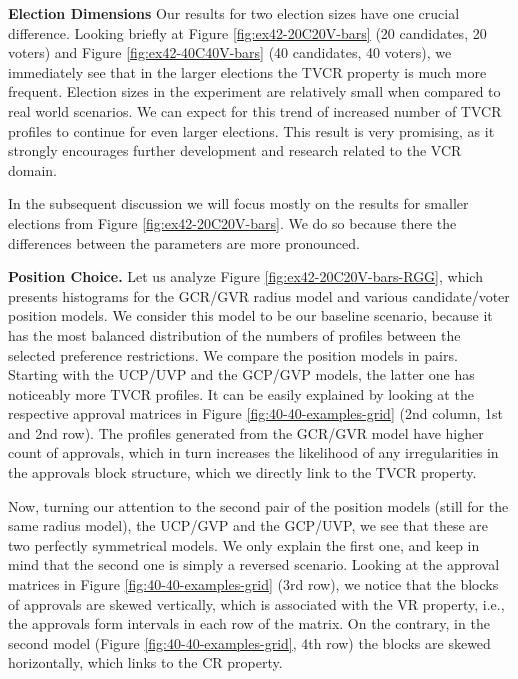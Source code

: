 \noindent \textbf{Election Dimensions} 
\indent Our results for two election sizes have one crucial difference.
Looking briefly at Figure \ref{fig:ex42-20C20V-bars} (20 candidates, 20 voters)
and Figure \ref{fig:ex42-40C40V-bars} (40 candidates, 40 voters), 
we immediately see that in the larger elections the TVCR property is much more frequent.
Election sizes in the experiment are relatively small when compared to real world scenarios.
We can expect for this trend of increased number of TVCR profiles to continue for even larger elections.
This result is very promising, as it strongly encourages further development and research related to the VCR domain.

In the subsequent discussion we will focus mostly on the results for smaller elections from
Figure \ref{fig:ex42-20C20V-bars}. We do so because there the differences between the parameters are more pronounced.
\newline

\noindent \textbf{Position Choice.} \indent Let us analyze Figure \ref{fig:ex42-20C20V-bars-RGG},
which presents histograms for the GCR/GVR radius model and various candidate/voter position models.
We consider this model to be our baseline scenario,
because it has the most balanced distribution of the numbers of profiles between the selected preference restrictions.
We compare the position models in pairs. 
Starting with the UCP/UVP and the GCP/GVP models,
the latter one has noticeably more TVCR profiles.
It can be easily explained by looking at the respective approval matrices in 
Figure \ref{fig:40-40-examples-grid} (2nd column, 1st and 2nd row).
The profiles generated from the GCR/GVR model have higher count of approvals,
which in turn increases the likelihood of any irregularities in the approvals block structure,
which we directly link to the TVCR property.   

Now, turning our attention to the second pair of the position models (still for the same radius model),
the UCP/GVP and the GCP/UVP, we see that these are two perfectly symmetrical models.
We only explain the first one, and keep in mind that the second one is simply a reversed scenario.
Looking at the approval matrices in Figure \ref{fig:40-40-examples-grid} (3rd row),
we notice that the blocks of approvals are skewed vertically,
which is associated with the VR property, i.e., the approvals form intervals in each row of the matrix.
On the contrary, in the second model (Figure \ref{fig:40-40-examples-grid}, 4th row)
the blocks are skewed horizontally, which links to the CR property.
\newline

